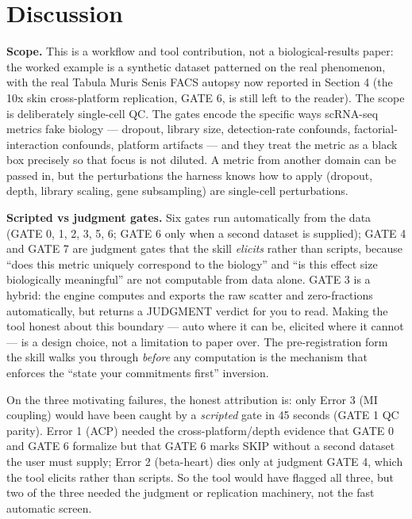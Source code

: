 \documentclass[
  11pt,
]{article}
\begin{document}
\section{Discussion}\label{discussion}

\textbf{Scope.} This is a workflow and tool contribution, not a
biological-results paper: the worked example is a synthetic dataset
patterned on the real phenomenon, with the real Tabula Muris Senis FACS
autopsy now reported in Section 4 (the 10x skin cross-platform
replication, GATE 6, is still left to the reader). The scope is
deliberately single-cell QC. The gates encode the specific ways
scRNA-seq metrics fake biology --- dropout, library size, detection-rate
confounds, factorial-interaction confounds, platform artifacts --- and
they treat the metric as a black box precisely so that focus is not
diluted. A metric from another domain can be passed in, but the
perturbations the harness knows how to apply (dropout, depth, library
scaling, gene subsampling) are single-cell perturbations.

\textbf{Scripted vs judgment gates.} Six gates run automatically from
the data (GATE 0, 1, 2, 3, 5, 6; GATE 6 only when a second dataset is
supplied); GATE 4 and GATE 7 are judgment gates that the skill
\emph{elicits} rather than scripts, because ``does this metric uniquely
correspond to the biology'' and ``is this effect size biologically
meaningful'' are not computable from data alone. GATE 3 is a hybrid: the
engine computes and exports the raw scatter and zero-fractions
automatically, but returns a JUDGMENT verdict for you to read. Making
the tool honest about this boundary --- auto where it can be, elicited
where it cannot --- is a design choice, not a limitation to paper over.
The pre-registration form the skill walks you through \emph{before} any
computation is the mechanism that enforces the ``state your commitments
first'' inversion.

On the three motivating failures, the honest attribution is: only Error
3 (MI coupling) would have been caught by a \emph{scripted} gate in 45
seconds (GATE 1 QC parity). Error 1 (ACP) needed the
cross-platform/depth evidence that GATE 0 and GATE 6 formalize but that
GATE 6 marks SKIP without a second dataset the user must supply; Error 2
(beta-heart) dies only at judgment GATE 4, which the tool elicits rather
than scripts. So the tool would have flagged all three, but two of the
three needed the judgment or replication machinery, not the fast
automatic screen.
\end{document}
